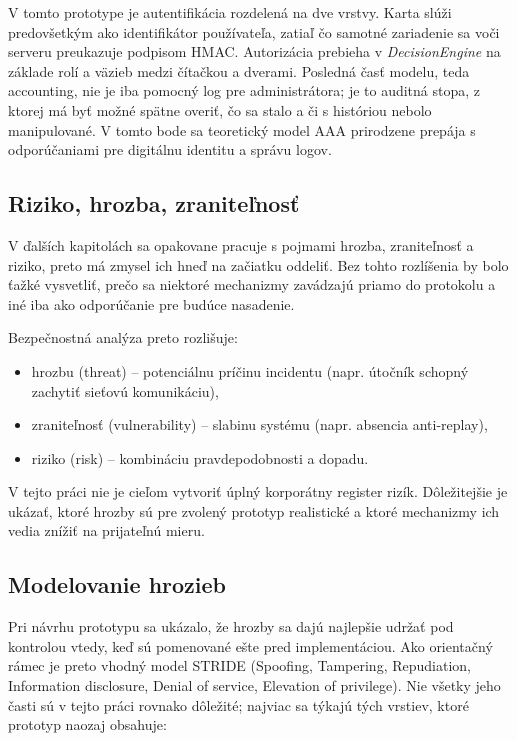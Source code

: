 \documentclass[journal,a4paper,onecolumn]{IEEEtran}
\begin{document}
V tomto prototype je autentifikácia rozdelená na dve vrstvy. Karta slúži predovšetkým ako identifikátor používateľa, zatiaľ čo samotné zariadenie sa voči serveru preukazuje podpisom HMAC. Autorizácia prebieha v \emph{DecisionEngine} na základe rolí a väzieb medzi čítačkou a dverami. Posledná časť modelu, teda accounting, nie je iba pomocný log pre administrátora; je to auditná stopa, z ktorej má byť možné spätne overiť, čo sa stalo a či s históriou nebolo manipulované. V tomto bode sa teoretický model AAA prirodzene prepája s odporúčaniami pre digitálnu identitu a správu logov.\cite{NIST80063B4,NIST80092}

\subsection{Riziko, hrozba, zraniteľnosť}

V ďalších kapitolách sa opakovane pracuje s pojmami hrozba, zraniteľnosť a riziko, preto má zmysel ich hneď na začiatku oddeliť. Bez tohto rozlíšenia by bolo ťažké vysvetliť, prečo sa niektoré mechanizmy zavádzajú priamo do protokolu a iné iba ako odporúčanie pre budúce nasadenie.

Bezpečnostná analýza preto rozlišuje:

\begin{itemize}[leftmargin=*,itemsep=2pt]
  \item hrozbu (threat) -- potenciálnu príčinu incidentu (napr. útočník schopný zachytiť sieťovú komunikáciu),
  \item zraniteľnosť (vulnerability) -- slabinu systému (napr. absencia anti-replay),
  \item riziko (risk) -- kombináciu pravdepodobnosti a dopadu.
\end{itemize}

V tejto práci nie je cieľom vytvoriť úplný korporátny register rizík. Dôležitejšie je ukázať, ktoré hrozby sú pre zvolený prototyp realistické a ktoré mechanizmy ich vedia znížiť na prijateľnú mieru.

\subsection{Modelovanie hrozieb}

Pri návrhu prototypu sa ukázalo, že hrozby sa dajú najlepšie udržať pod kontrolou vtedy, keď sú pomenované ešte pred implementáciou. Ako orientačný rámec je preto vhodný model STRIDE\cite{STRIDE} (Spoofing, Tampering, Repudiation, Information disclosure, Denial of service, Elevation of privilege). Nie všetky jeho časti sú v tejto práci rovnako dôležité; najviac sa týkajú tých vrstiev, ktoré prototyp naozaj obsahuje:
\end{document}
